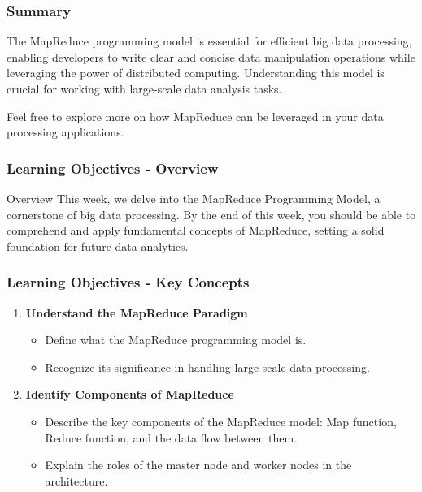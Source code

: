 \documentclass[aspectratio=169]{beamer}
\begin{document}
\begin{frame}[fragile]
    \frametitle{Summary}

    The MapReduce programming model is essential for efficient big data processing, enabling developers to write clear and concise data manipulation operations while leveraging the power of distributed computing. Understanding this model is crucial for working with large-scale data analysis tasks.

    \smallskip
    Feel free to explore more on how MapReduce can be leveraged in your data processing applications.
\end{frame}

\begin{frame}[fragile]
    \frametitle{Learning Objectives - Overview}
    \begin{block}{Overview}
        This week, we delve into the MapReduce Programming Model, a cornerstone of big data processing. By the end of this week, you should be able to comprehend and apply fundamental concepts of MapReduce, setting a solid foundation for future data analytics.
    \end{block}
\end{frame}

\begin{frame}[fragile]
    \frametitle{Learning Objectives - Key Concepts}
    \begin{enumerate}
        \item \textbf{Understand the MapReduce Paradigm}
        \begin{itemize}
            \item Define what the MapReduce programming model is.
            \item Recognize its significance in handling large-scale data processing.
        \end{itemize}
        
        \item \textbf{Identify Components of MapReduce}
        \begin{itemize}
            \item Describe the key components of the MapReduce model: Map function, Reduce function, and the data flow between them.
            \item Explain the roles of the master node and worker nodes in the architecture.
        \end{itemize}
    \end{enumerate}
\end{frame}
\end{document}
